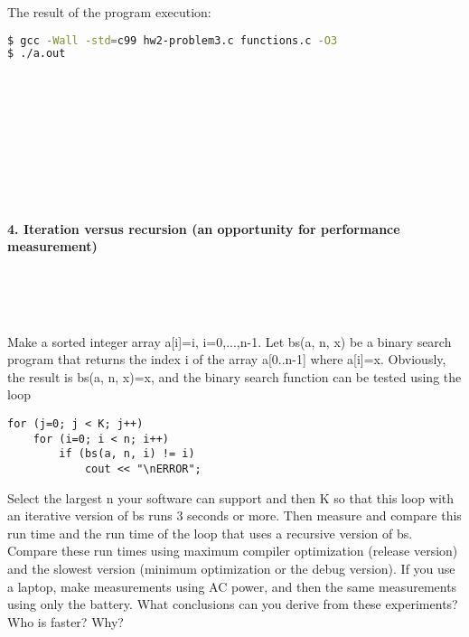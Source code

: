 \documentclass{article}
\begin{document}
		\rmfamily
		\noindent The result of the program execution:
		
		\ttfamily
		\begin{lstlisting}[language=bash]
$ gcc -Wall -std=c99 hw2-problem3.c functions.c -O3
$ ./a.out
		\end{lstlisting}
		
\paragraph{}\	
\paragraph{}\
\paragraph{}\
\paragraph{}\

	\rmfamily
	
	\paragraph{4. Iteration versus recursion (an opportunity for performance measurement) }\
	
	\rmfamily\
	
		Make a sorted integer array a[i]=i, i=0,...,n-1.  Let bs(a, n, x) be a binary search program that returns the index i of the array a[0..n-1] where a[i]=x. Obviously, the result is bs(a, n, x)=x, and the binary search function can be tested using the loop
		
		\begin{verbatim}
for (j=0; j < K; j++)
    for (i=0; i < n; i++)
        if (bs(a, n, i) != i)
            cout << "\nERROR";
		\end{verbatim}
		
		
		Select the largest n your software can support and then K so that this loop with an iterative version of bs runs 3 seconds or more. Then measure and compare this run time and the run time of the loop that uses a recursive version of bs. Compare these run times using maximum compiler optimization (release version) and the slowest version (minimum optimization or the debug version). If you use a laptop, make measurements using AC power, and then the same measurements using only the battery. What conclusions can you derive from these experiments? Who is faster? Why?
		\newline
		
\end{document}
